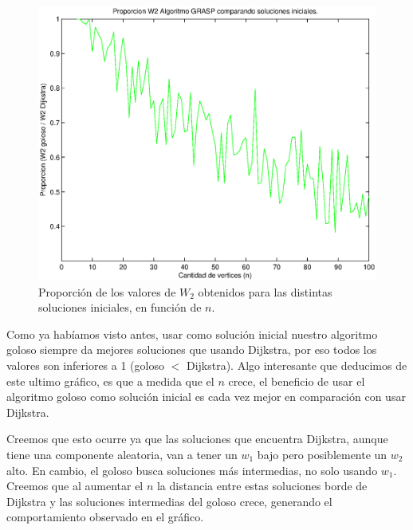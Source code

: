 \begin{figure}[H]
  \begin{center}
    \begin{minipage}{0.7\linewidth}
      \includegraphics[width=\linewidth]{graficos/grasp_comparacion_soluciones_iniciales_tiempo.eps}
      \caption{Proporción de los valores de $W_2$ obtenidos para las distintas soluciones iniciales, en función de $n$.}\label{fig:grasp-soluciones-iniciales-tiempo}
    \end{minipage}
  \end{center}
\end{figure}


Como ya habíamos visto antes, usar como solución inicial nuestro algoritmo goloso siempre da mejores soluciones que usando Dijkstra, por eso todos los valores son inferiores a 1 (goloso $<$ Dijkstra). Algo interesante que deducimos de este ultimo gráfico, es que a medida que el $n$ crece, el beneficio de usar el algoritmo goloso como solución inicial es cada vez mejor en comparación con usar Dijkstra.

Creemos que esto ocurre ya que las soluciones que encuentra Dijkstra, aunque tiene una componente aleatoria, van a tener un $w_1$ bajo pero posiblemente un $w_2$ alto. En cambio, el goloso busca soluciones más intermedias, no solo usando $w_1$. Creemos que al aumentar el $n$ la distancia entre estas soluciones borde de Dijkstra y las soluciones intermedias del goloso crece, generando el comportamiento observado en el gráfico.